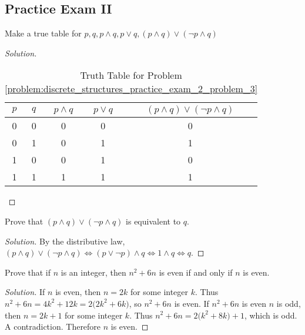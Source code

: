     \subsection{Practice Exam II}
    \begin{problem}
    \label{problem:discrete_structures_practice_exam_2_problem_3}
    Make a true table for $p,q,p\land q, p\lor q, (p\land q)\lor (\neg p\land q)$
    \end{problem}
    \begin{proof}[Solution]
    \vspace{-\topsep}
    \
    \begin{table}[H]
        \centering
        \captionsetup{type=table}
        \begin{tabular}{c c c c c} 
            \hline
            $p$ & $q$ & $p\land q$ & $p\lor q$ & $(p\land q)\lor(\neg p\land q)$ \\ [0.5ex] 
            \hline
            0 & 0 & 0 & 0 & 0\\ 
            0 & 1 & 0 & 1 & 1\\
            1 & 0 & 0 & 1 & 0\\
            1 & 1 & 1 & 1 & 1\\
            \hline
        \end{tabular}
        \caption{Truth Table for Problem \ref{problem:discrete_structures_practice_exam_2_problem_3}}
        \label{tab:discrete_structures_practice_exam_2_problem_3}
    \end{table}
    \end{proof}
    \begin{problem}
    Prove that $(p\land q)\lor(\neg p\land q)$ is equivalent to $q$.
    \end{problem}
    \begin{proof}[Solution]
    \vspace{-0.5\topsep}
    By the distributive law, $(p\land q)\lor(\neg p\land q) \Leftrightarrow (p\lor \neg p)\land q \Leftrightarrow 1\land q \Leftrightarrow q$.
    \end{proof}
    \begin{problem}
    Prove that if $n$ is an integer, then $n^2+6n$ is even if and only if $n$ is even.
    \end{problem}
    \begin{proof}[Solution]
    \vspace{-0.5\topsep}
    If $n$ is even, then $n=2k$ for some integer $k$. Thus $n^2+6n = 4k^2+12k = 2\big(2k^2+6k)$, so $n^2+6n$ is even. If $n^2+6n$ is even $n$ is odd, then $n=2k+1$ for some integer $k$. Thus $n^2+6n = 2\big(k^2+8k)+1$, which is odd. A contradiction. Therefore $n$ is even.
    \end{proof}
